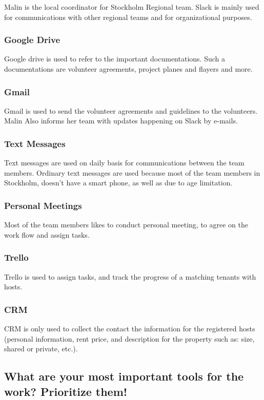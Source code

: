 Malin is the local coordinator for Stockholm Regional team. Slack is mainly used for communications with other regional teams and for organizational purposes.

 \subsubsection{Google Drive}
Google drive is used to refer to the important documentations. Such a documentations are volunteer agreements, project planes and flayers and more. 

\subsubsection{Gmail}
Gmail is used to send the volunteer agreements and guidelines to the volunteers. Malin Also informs her team with updates happening on Slack by e-mails. 

\subsubsection{Text Messages}
Text messages are used on daily basis for communications between the team members. Ordinary text messages are used because most of the team members in Stockholm, doesn't have a smart phone, as well as due to age limitation. 

\subsubsection{Personal Meetings}
Most of the team members likes to conduct personal meeting, to agree on the work flow and assign tasks.

 \subsubsection{Trello}
Trello is used to assign tasks, and track the progress of a matching tenants with hosts.
 
 \subsubsection{CRM}
CRM is only used to collect the contact the information for the registered hosts (personal information, rent price, and description for the property such as: size, shared or private, etc.). 
 

 
\subsection{What are your most important tools for the work? Prioritize them!}

